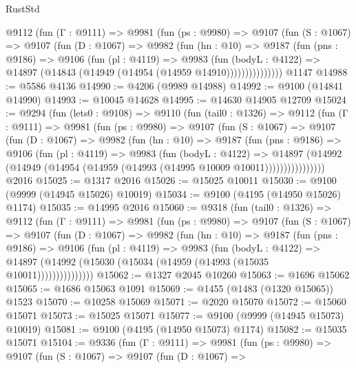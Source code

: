 \begin{lexlean}{RustStd}
\begin{coremodule}
        @9112
          (fun (Γ : @9111) =>
          @9981
            (fun (ps : @9980) =>
            @9107
              (fun (S : @1067) =>
              @9107
                (fun (D : @1067) =>
                @9982
                  (fun (hn : @10) =>
                  @9187
                    (fun (pns : @9186) =>
                    @9106
                      (fun (pl : @4119) =>
                      @9983
                        (fun (bodyL : @4122) =>
                        @14897 (@14843 (@14949 (@14954 (@14959 @14910)))))))))))))))
    @1147
@14988 := @5586 @4136
@14990 := @4206 (@9989 @14988)
@14992 := @9100 (@14841 @14990)
@14993 := @10045 @14628
@14995 := @14630 @14905 @12709
@15024 := @9294
    (fun (lets0 : @9108) =>
    @9110
      (fun (tail0 : @1326) =>
      @9112
        (fun (Γ : @9111) =>
        @9981
          (fun (ps : @9980) =>
          @9107
            (fun (S : @1067) =>
            @9107
              (fun (D : @1067) =>
              @9982
                (fun (hn : @10) =>
                @9187
                  (fun (pns : @9186) =>
                  @9106
                    (fun (pl : @4119) =>
                    @9983
                      (fun (bodyL : @4122) =>
                      @14897
                        (@14992
                          (@14949 (@14954 (@14959 (@14993 (@14995 @10009 @10011))))))))))))))))
    @2016
@15025 := @1317 @2016
@15026 := @15025 @10011
@15030 := @9100 (@9999 (@14945 @15026) @10019)
@15034 := @9100 (@4195 (@14950 @15026) @1174)
@15035 := @14995 @2016
@15060 := @9318
    (fun (tail0 : @1326) =>
    @9112
      (fun (Γ : @9111) =>
      @9981
        (fun (ps : @9980) =>
        @9107
          (fun (S : @1067) =>
          @9107
            (fun (D : @1067) =>
            @9982
              (fun (hn : @10) =>
              @9187
                (fun (pns : @9186) =>
                @9106
                  (fun (pl : @4119) =>
                  @9983
                    (fun (bodyL : @4122) =>
                    @14897 (@14992 (@15030 (@15034 (@14959 (@14993 (@15035 @10011)))))))))))))))
@15062 := @1327 @2045 @10260
@15063 := @1696 @15062
@15065 := @1686 @15063 @1091
@15069 := @1455 (@1483 (@1320 @15065)) @1523
@15070 := @10258 @15069
@15071 := @2020 @15070
@15072 := @15060 @15071
@15073 := @15025 @15071
@15077 := @9100 (@9999 (@14945 @15073) @10019)
@15081 := @9100 (@4195 (@14950 @15073) @1174)
@15082 := @15035 @15071
@15104 := @9336
    (fun (Γ : @9111) =>
    @9981
      (fun (ps : @9980) =>
      @9107
        (fun (S : @1067) =>
        @9107
          (fun (D : @1067) =>

\end{coremodule}
\end{lexlean}
